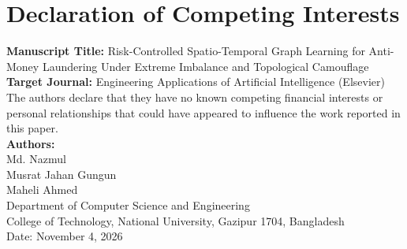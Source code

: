 \documentclass[a4paper,11pt]{article}
\begin{document}
\section*{Declaration of Competing Interests}

\noindent\textbf{Manuscript Title:} Risk-Controlled Spatio-Temporal Graph Learning for Anti-Money Laundering Under Extreme Imbalance and Topological Camouflage\\[1.5ex]
\textbf{Target Journal:} Engineering Applications of Artificial Intelligence (Elsevier)\\[2.0ex]

\noindent The authors declare that they have no known competing financial interests or personal relationships that could have appeared to influence the work reported in this paper.\\[3.0ex]

\noindent\textbf{Authors:}\\
Md. Nazmul\\
Musrat Jahan Gungun\\
Maheli Ahmed\\[2.0ex]
Department of Computer Science and Engineering\\
College of Technology, National University, Gazipur 1704, Bangladesh\\[2.0ex]
Date: November 4, 2026
\end{document}
